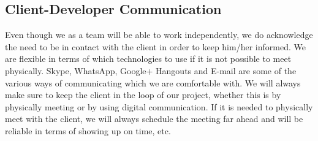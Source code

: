 \subsection{Client-Developer Communication}
Even though we as a team will be able to work independently, we do acknowledge the need to be in contact with the client in order to keep him/her informed. We are flexible in terms of which technologies to use if it is not possible to meet physically. Skype, WhatsApp, Google+ Hangouts and E-mail are some of the various ways of communicating which we are comfortable with. We will always make sure to keep the client in the loop of our project, whether this is by physically meeting or by using digital communication. If it is needed to physically meet with the client, we will always schedule the meeting far ahead and will be reliable in terms of showing up on time, etc.
